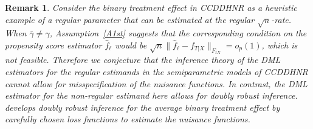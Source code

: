 \documentclass[lettersize, 12pt]{article}
\newtheorem{remark}{Remark}
\begin{document}
\begin{remark}{\rm 
Consider the binary treatment effect in CCDDHNR as a heuristic example of a regular parameter that can be estimated at the regular $\sqrt{n}$-rate.
When $\bar\gamma \neq \gamma$,
Assumption~\ref{A1st} suggests that the corresponding condition on the propensity score estimator $\hat f_\ell$ would be
$\sqrt{n}\|\hat f_{\ell} - f_{T|X}\|_{F_{tX}} = o_p(1)$, which is not feasible.  
Therefore  we conjecture that the inference theory of the DML estimators
for the regular estimands in the semiparametric models of CCDDHNR cannot allow for misspecification of the nuisance functions.
In contrast, the DML estimator for the non-regular estimand here allows for doubly robust inference.
\cite{TanAS} develops doubly robust inference for the average binary treatment effect by carefully chosen loss functions to estimate the nuisance functions.
}\end{remark}
\end{document}
